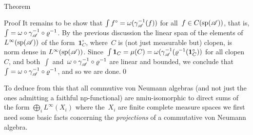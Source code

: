 \documentclass[a]{subfiles}
\begin{document}
\begin{parsec}
\begin{point}{Theorem}
\begin{point}{Proof}
It remains to be show that
$\int f^\circ = \omega(\gamma_{\mathscr{A}}^{-1}(f))$
for all~$f\in C(\mathrm{sp}(\mathscr{A}))$,
that is, $\int = \omega\circ \gamma_{\mathscr{A}}^{-1}\circ \varrho^{-1}$.
By the previous discussion the linear span
of the elements of~$L^\infty(\mathrm{sp}(\mathscr{A}))$
of the form~$\mathbf{1}_C^\circ$,
where~$C$ is (not just measurable but) clopen,
is norm dense in $L^\infty(\mathrm{sp}(\mathscr{A}))$.
Since~$\int \mathbf{1}_C
= \mu(C)=\omega(\gamma_{\mathscr{A}}^{-1} (\varrho^{-1}(\mathbf{1}_C^\circ ))$
for all clopen~$C$,
and both~$\int$ and~$\omega\circ\gamma_{\mathscr{A}}^{-1}\circ \varrho^{-1}$
are linear and bounded,
we conclude that~$\int = \omega\circ \gamma_{\mathscr{A}}^{-1} \circ \varrho^{-1}$,
and so we are done.\qed
\end{point}
\begin{point}%
To deduce from this that all commutive von Neumann algebras
(and not just the ones admitting a faithful np-functional)
are nmiu-isomorphic
to direct sums of the form  $\bigoplus_i L^\infty(X_i)$
where the~$X_i$ are finite complete measure spaces
we first need some basic facts concerning the
\emph{projections} of a commutative von Neumann algebra.
\end{point}
\end{point}
\end{parsec}%
\end{document}
